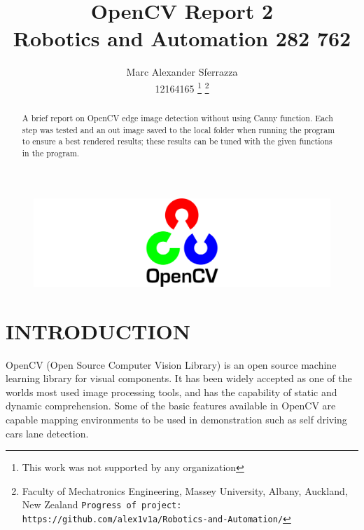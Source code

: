 \documentclass[a4paper, 10pt]{article}
\title{\LARGE \bf OpenCV Report 2\\Robotics and Automation  282 762}
\author{Marc Alexander Sferrazza \\ 12164165
\thanks{This work was not supported by any organization}
\thanks{Faculty of Mechatronics Engineering, Massey University, Albany, Auckland, New Zealand
        {\tt\small Progress of project: https://github.com/alex1v1a/Robotics-and-Automation/} } }
\begin{document}
\maketitle

\begin{figure}[H]
  \includegraphics[width=\linewidth]{images/opencv}
  \label{fig:opencv}
\end{figure}

\thispagestyle{empty}
\pagestyle{plain}



\begin{abstract}

A brief report on OpenCV edge image detection without using Canny function. Each step was tested and an out image saved to the local folder when running the program to ensure a best rendered results; these results can be tuned with the given functions in the program.

\end{abstract}


\clearpage
\tableofcontents
\thispagestyle{empty}
\clearpage


\setcounter{page}{1}

\section{INTRODUCTION}

OpenCV (Open Source Computer Vision Library) is an open source machine learning library for visual components. It has been widely accepted as one of the worlds most used image processing tools, and has the capability of static and dynamic comprehension. Some of the basic features available in OpenCV are capable mapping environments to be used in demonstration such as self driving cars lane detection. 
\end{document}
